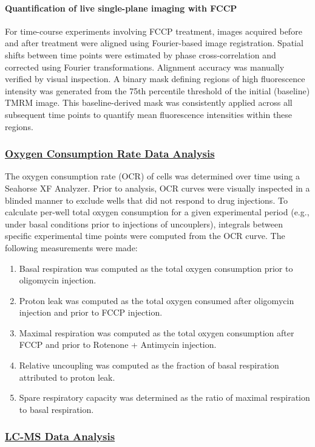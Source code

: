 \documentclass[12pt]{article}
\begin{document}
\paragraph{Quantification of live single-plane imaging with FCCP}
For time-course experiments involving FCCP treatment, images acquired before and after treatment were aligned using Fourier-based image registration. Spatial shifts between time points were estimated by phase cross-correlation and corrected using Fourier transformations. Alignment accuracy was manually verified by visual inspection. A binary mask defining regions of high fluorescence intensity was generated from the 75th percentile threshold of the initial (baseline) TMRM image. This baseline-derived mask was consistently applied across all subsequent time points to quantify mean fluorescence intensities within these regions. \subsubsection{\underline{Oxygen Consumption Rate Data Analysis}}
The oxygen consumption rate (OCR) of cells was determined over time using a Seahorse XF Analyzer. Prior to analysis, OCR curves were visually inspected in a blinded manner to exclude wells that did not respond to drug injections. To calculate per-well total oxygen consumption for a given experimental period (e.g., under basal conditions prior to injections of uncouplers), integrals between specific experimental time points were computed from the OCR curve. The following measurements were made:
\begin{enumerate}
    \item Basal respiration was computed as the total oxygen consumption prior to oligomycin injection.
    \item Proton leak was computed as the total oxygen consumed after oligomycin injection and prior to FCCP injection.
    \item Maximal respiration was computed as the total oxygen consumption after FCCP and prior to Rotenone + Antimycin injection.
    \item Relative uncoupling was computed as the fraction of basal respiration attributed to proton leak.
    \item Spare respiratory capacity was determined as the ratio of maximal respiration to basal respiration.
\end{enumerate} \subsubsection{\underline{LC-MS Data Analysis}} 
\end{document}
